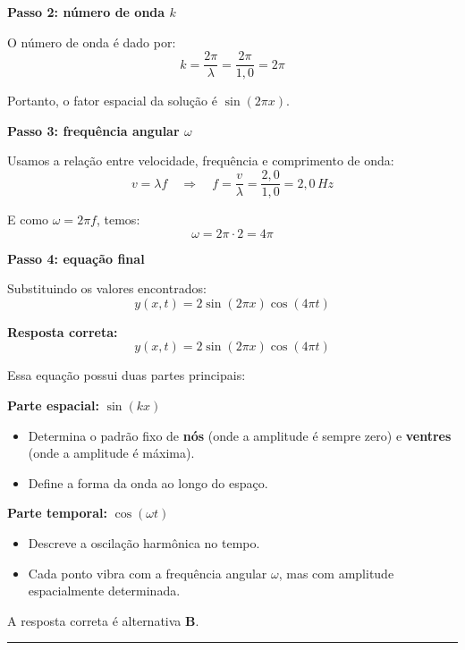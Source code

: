 \documentclass[a4paper,12pt]{article}
\begin{document}
\begin{flushleft}
\bigskip

\textbf{Passo 2: número de onda \(k\)}

O número de onda é dado por:
\[
k = \frac{2\pi}{\lambda} = \frac{2\pi}{1,0} = 2\pi
\]

Portanto, o fator espacial da solução é \(\sin(2\pi x)\).

\bigskip

\textbf{Passo 3: frequência angular \(\omega\)}

Usamos a relação entre velocidade, frequência e comprimento de onda:
\[
v = \lambda f \quad \Longrightarrow \quad f = \frac{v}{\lambda} = \frac{2,0}{1,0} = 2,0\,Hz
\]

E como \(\omega = 2\pi f\), temos:
\[
\omega = 2\pi \cdot 2 = 4\pi
\]

\bigskip

\textbf{Passo 4: equação final}

Substituindo os valores encontrados:
\[
y(x,t) = 2 \sin(2\pi x) \cos(4\pi t)
\]

\bigskip

\textbf{Resposta correta:}
\[
\boxed{y(x,t) = 2 \sin(2\pi x) \cos(4\pi t)}
\]

Essa equação possui duas partes principais:

\bigskip

\textbf{Parte espacial:} \(\sin(kx)\)
\begin{itemize}
    \item Determina o padrão fixo de \textbf{nós} (onde a amplitude é sempre zero) e \textbf{ventres} (onde a amplitude é máxima).
    \item Define a forma da onda ao longo do espaço.
\end{itemize}

\bigskip

\textbf{Parte temporal:} \(\cos(\omega t)\)
\begin{itemize}
    \item Descreve a oscilação harmônica no tempo.
    \item Cada ponto vibra com a frequência angular \(\omega\), mas com amplitude espacialmente determinada.
\end{itemize}


A resposta correta é alternativa \colorbox{green!50}{\textbf{B}}.
\end{flushleft}

\noindent\rule{\linewidth}{0.6pt}\\
\end{document}
